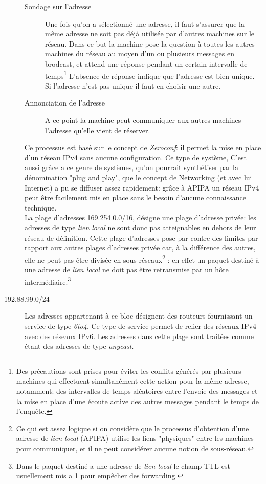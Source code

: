 \begin{description}
\begin{description}
\item[Sondage sur l'adresse]
Une fois qu'on a sélectionné une adresse, il faut s'assurer que la même adresse ne soit
pas déjà utilisée par d'autres machines sur le réseau. Dans ce but la machine
pose la question à toutes les autres machines du réseau au moyen d'un ou plusieurs messages
en brodcast, et attend une réponse pendant un certain intervalle de temps\footnote{
Des précautions sont prises pour éviter les conflits générés par plusieurs
machines qui effectuent simultanément cette action pour la même adresse,
notamment: des intervalles de temps aléatoires entre l'envoie des messages et la mise
en place d'une écoute active des autres messages pendant le temps de l'enquête.}
L'absence de réponse indique que l'adresse est bien unique. Si l'adresse n'est
pas unique il faut en choisir une autre.

\item[Annonciation de l'adresse]
A ce point la machine peut communiquer aux autres machines l'adresse qu'elle
vient de réserver.

\end{description}



Ce processus est basé sur le concept de {\it Zeroconf}: il permet la mise en
place d'un réseau IPv4 sans aucune configuration. Ce type de système, C'est
aussi grâce a ce genre de systèmes, qu'on pourrait synthétiser par la
dénomination "plug and play", que le concept de Networking (et avec lui
Internet) a pu se diffuser assez rapidement: grâce à APIPA un réseau IPv4 peut
être facilement mis en place sans le besoin d'aucune connaissance technique.\\

La plage d'adresses 169.254.0.0/16, désigne une plage d'adresse privée: les
adresses de type {\it lien local} ne sont donc pas atteignables en dehors de
leur réseau de définition. 
Cette plage d'adresses pose par contre des limites par rapport aux autres
plages d'adresses privée car, à la différence des autres, elle ne peut pas être
divisée en sous réseaux\footnote{Ce qui est assez logique si on considère que
le processus d'obtention d'une adresse de {\it lien local} (APIPA) utilise
les liens "physiques" entre les machines pour communiquer, et il ne peut
 considérer aucune notion de sous-réseau.}
: en effet un paquet destiné à une adresse de {\it lien local} ne doit pas être
retransmise par un hôte intermédiaire.\footnote{Dans le paquet destiné
a une adresse de {\it lien local} le champ TTL est usuellement mis a 1
pour empêcher des forwarding.}

\item[192.88.99.0/24]
Les adresses appartenant à ce bloc désignent des routeurs 
fournissant un service de type {\it 6to4}. Ce type de service
permet de relier des réseaux IPv4 avec des réseaux IPv6.
Les adresses dans cette plage sont traitées comme étant des adresses
de type {\it anycast}.


\end{description}



